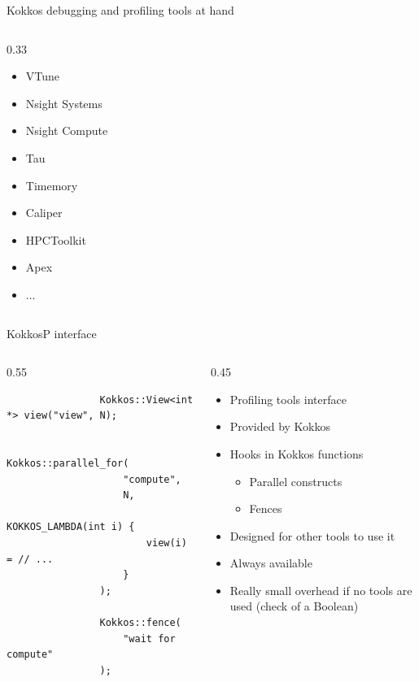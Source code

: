 \documentclass[
    aspectratio=169,
]{beamer}
\begin{document}
\begin{frame}{Kokkos debugging and profiling tools at hand}
\begin{columns}[T]
\begin{column}{0.33\linewidth}
\begin{itemize}
                \item VTune
                \item Nsight Systems
                \item Nsight Compute
                \item Tau
                \item Timemory
                \item Caliper
                \item HPCToolkit
                \item Apex
                \item ...
            \end{itemize}
        \end{column}
    \end{columns}
\end{frame}

\begin{frame}[fragile]{KokkosP interface}
    \begin{columns}
        \begin{column}{0.55\linewidth}
            \begin{verbatim}
                Kokkos::View<int *> view("view", N);

                Kokkos::parallel_for(
                    "compute",
                    N,
                    KOKKOS_LAMBDA(int i) {
                        view(i) = // ...
                    }
                );

                Kokkos::fence(
                    "wait for compute"
                );
            \end{verbatim}
        \end{column}
        \begin{column}{0.45\linewidth}
            \begin{itemize}
                \item Profiling tools interface
                \item Provided by Kokkos
                \item Hooks in Kokkos functions
                \begin{itemize}
                    \item Parallel constructs
                    \item Fences
                \end{itemize}
                \item Designed for other tools to use it
                \item Always available
                \item Really small overhead if no tools are used (check of a Boolean)
            \end{itemize}
        \end{column}
    \end{columns}
\end{frame}
\end{document}
